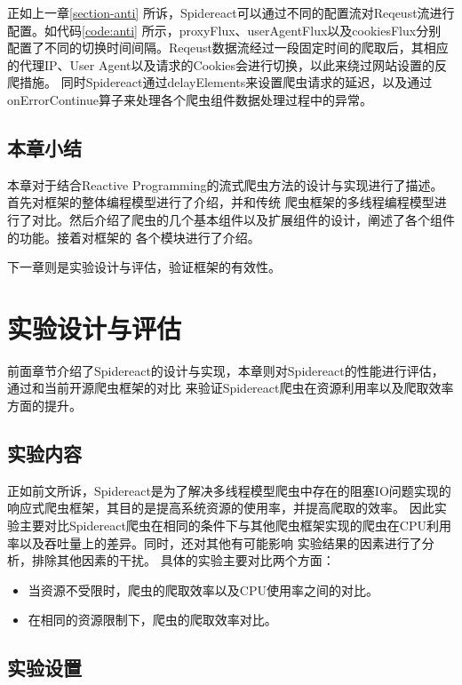 \documentclass[master]{njuthesis}
\begin{document}
正如上一章\ref{section-anti} 所诉，Spidereact可以通过不同的配置流对Reqeust流进行配置。如代码\ref{code:anti} 所示，proxyFlux、userAgentFlux以及cookiesFlux分别
配置了不同的切换时间间隔。Reqeust数据流经过一段固定时间的爬取后，其相应的代理IP、User Agent以及请求的Cookies会进行切换，以此来绕过网站设置的反爬措施。
同时Spidereact通过delayElements来设置爬虫请求的延迟，以及通过onErrorContinue算子来处理各个爬虫组件数据处理过程中的异常。

\section{本章小结}
本章对于结合Reactive Programming的流式爬虫方法的设计与实现进行了描述。首先对框架的整体编程模型进行了介绍，并和传统
爬虫框架的多线程编程模型进行了对比。然后介绍了爬虫的几个基本组件以及扩展组件的设计，阐述了各个组件的功能。接着对框架的
各个模块进行了介绍。

下一章则是实验设计与评估，验证框架的有效性。




\chapter{实验设计与评估}\label{Chapter_test}
前面章节介绍了Spidereact的设计与实现，本章则对Spidereact的性能进行评估，通过和当前开源爬虫框架的对比
来验证Spidereact爬虫在资源利用率以及爬取效率方面的提升。



\section{实验内容}
正如前文所诉，Spidereact是为了解决多线程模型爬虫中存在的阻塞IO问题实现的响应式爬虫框架，其目的是提高系统资源的使用率，并提高爬取的效率。
因此实验主要对比Spidereact爬虫在相同的条件下与其他爬虫框架实现的爬虫在CPU利用率以及吞吐量上的差异。同时，还对其他有可能影响
实验结果的因素进行了分析，排除其他因素的干扰。
具体的实验主要对比两个方面：

\begin{itemize}
\item 当资源不受限时，爬虫的爬取效率以及CPU使用率之间的对比。
\item 在相同的资源限制下，爬虫的爬取效率对比。
\end{itemize}

\section{实验设置}
\end{document}
